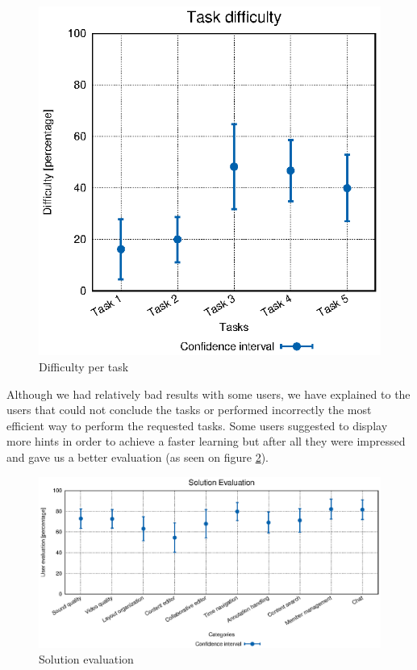 \begin{figure}[!htb]
\begin{minipage}{.5\textwidth}
    \includegraphics[width=\textwidth]{stats/user_diffs.eps}
  \caption{Difficulty per task}
  \label{fig:user_diffs}
\end{minipage}
\end{figure}


Although we had relatively bad results with some users, we have explained to the users that could not conclude the tasks or performed incorrectly the most efficient way to perform the requested tasks. Some users suggested to display more hints in order to achieve a faster learning but after all they were impressed and gave us a better evaluation (as seen on figure \ref{fig:user_evals}).

\begin{figure}[!htb]
  \centering
  \includegraphics[width=\textwidth]{stats/user_evals.eps}
  \caption{Solution evaluation}
  \label{fig:user_evals}
\end{figure}



